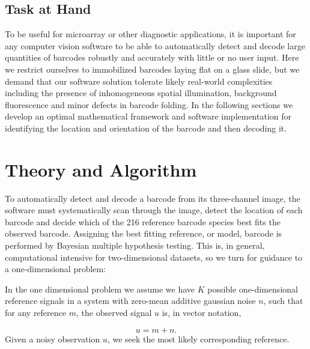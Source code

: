 \subsection{Task at Hand}
To be useful for microarray or other diagnostic applications, it is important for any computer vision software to be able to automatically detect and decode large quantities of barcodes robustly and accurately with little or no user input. 
Here we restrict ourselves to immobilized barcodes laying flat on a glass slide, but we demand that our software solution tolerate  likely real-world complexities including the presence of inhomogeneous spatial illumination, background fluorescence and minor defects in barcode folding.  
In the following sections we develop an optimal mathematical framework and software implementation for identifying the location and orientation of the barcode and then decoding it.


\section{Theory and Algorithm}
To automatically detect and decode a barcode from its three-channel image, the software must systematically scan through the image, detect the location of each barcode and decide which of the 216 reference barcode species best fits the observed barcode. Assigning the best fitting reference, or model, barcode is performed by Bayesian multiple hypothesis testing. This is, in general, computational intensive for two-dimensional datasets, so we turn for guidance to a one-dimensional problem: 

In the one dimensional problem we assume we have $K$ possible one-dimensional reference signals in a system with zero-mean additive gaussian noise $n$, such that for any reference $m$, the observed signal $u$ is, in vector notation,

\begin{equation}
u=m + n.
\end{equation}
Given a noisy observation $u$, we seek the most likely corresponding reference. 



